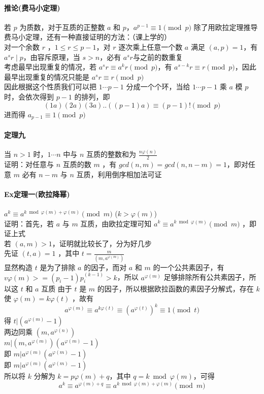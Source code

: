 	\paragraph{推论(费马小定理)}若 $p$ 为质数，对于互质的正整数 $a$ 和 $p$，$a^{p-1}\equiv 1\pmod p$
	除了用欧拉定理推导费马小定理，还有一种直接证明的方法：（课上学的）\\	
	对一个余数 $r$ ，$1\le r\le p-1$，对 $r$ 逐次乘上任意一个数 $a$ 满足 $(a,p)=1$，有 $a^sr\mid p$，由容斥原理，当 $s>n$，必有 $a^sr$与之前的数重复\\
	考虑最早出现重复的情况，若 $a^sr\equiv a^kr\pmod p$，有 $a^{s-k}r\equiv r\pmod p$，因此最早出现重复的情况只能是 $a^{s}r\equiv r\pmod p$\\
	因此根据这个性质我们可以把 $1\cdots p-1$ 分成一个个环，当给 $1\cdots p-1$ 乘 $a$ 模 $p$ 时，会依次得到 $p-1$ 的排列，即
	$$
	(1a)(2a)(3a)..((p-1)a)\equiv (p-1)!\pmod p
	$$
	进而得 $a_{p-1}\equiv1\pmod p$\\
	\paragraph{定理九}当 $n>1$ 时，$1\cdots n$ 中与 $n$ 互质的整数和为 $\frac{n\varphi(n)}{2}$\\
	证明：对任意与 $n$ 互质的数 $m$ ，有 $gcd(n,m)=gcd(n,n-m)=1$，即对任意 $m$ 必有 $n-m$ 与 $n$ 互质，利用倒序相加法可证
	\paragraph{Ex定理一(欧拉降幂)} $a^k\equiv a^{k\bmod \varphi(m)+\varphi(m)}\pmod m$ ($k>\varphi(m)$)\\
	证明：首先，若 $a$ 与 $m$ 互质，由欧拉定理可知 $a^k\equiv a^{k\bmod \varphi(m)}\pmod m$ ，即证上式\\
	若 $(a,m)>1$，证明就比较长了，分为好几步\\
	先证 $(t,a)=1$ ，其中 $t=\frac{m}{(m,a^{\varphi(m)})}$\\
	显然构造 $t$ 是为了排除 $a$ 的因子，而对 $a$ 和 $m$ 的一个公共素因子，有 $v\varphi(m)>=(p_i-1)p_i^(k-1)>k$，所以 $a^{\varphi(m)}$ 足够排除所有公共素因子，所以这 $t$ 和 $a$ 互质
	由于 $t$ 是 $m$ 的因子，所以根据欧拉函数的素因子分解式，存在 $k$ 使 $\varphi(m)=k\varphi(t)$ ，故有
	$$
	a^{\varphi(m)}\equiv a^{k\varphi(t)}\equiv(a^{\varphi(t)})^k\equiv1\pmod t
	$$
	得 $t|(a^{\varphi(m)}-1)$\\
	两边同乘 $(m,a^{\varphi(n)})$\\
	$m|(m,a^{\varphi(m)})(a^{\varphi(m)}-1)$\\
	即 $m|a^{\varphi(m)}(a^{\varphi(m)}-1)$\\
	即 $m|a^{\varphi(m)}(a^{\varphi(m)}-1)$\\
	所以将 $k$ 分解为 $k=p\varphi(m)+q$，其中 $q=k\bmod \varphi(m)$，可得
	$$
	a^k\equiv a^{\varphi(m)+q}\equiv a^{k\bmod \varphi(m)+\varphi(m)}\pmod m
	$$
	~\\
